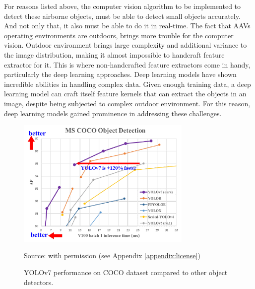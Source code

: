     For reasons listed above, the computer vision algorithm to be implemented to detect these airborne objects, 
    must be able to detect small objects accurately. And not only that, it also must be able to do it in real-time.
    The fact that AAVs operating environments are outdoors, brings more trouble for the computer
    vision. Outdoor environment brings large complexity and additional variance to the image distribution, 
    making it almost impossible to handcraft feature extractor for it. This is where non-handcrafted
    feature extractors come in handy, particularly the deep learning approaches. Deep learning models
    have shown incredible abilities in handling complex data. Given enough training data, a deep learning
    model can craft itself feature kernels that can extract the objects in an image, despite being subjected
    to complex outdoor environment. For this reason, deep learning models gained prominence in addressing
    these challenges. 
    
    \begin{figure}[t]
        \centering
        \includegraphics[width=0.75\textwidth]{figures/yolov7-coco.png}
        \caption*{Source: \textcite{yolov7} with permission (see Appendix \ref{appendix:license})}
        \vspace{-2ex}
        \caption{YOLOv7 performance on COCO dataset compared to other object detectors.}
        \label{fig:yolov7-coco}

    \end{figure}

